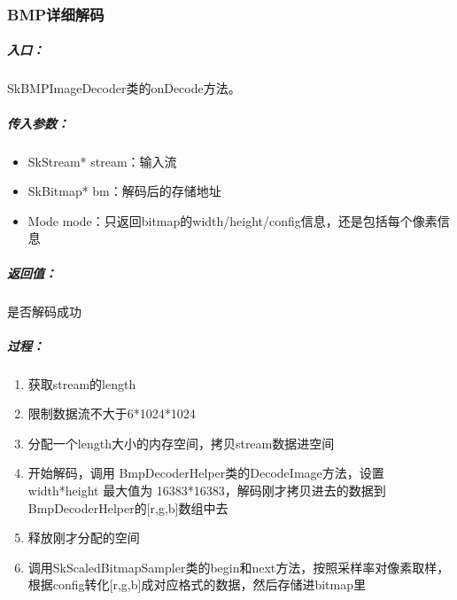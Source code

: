 \subsubsection{BMP详细解码}
\label{sec:bmp-decode}

\subparagraph{入口：}
SkBMPImageDecoder类的onDecode方法。

\subparagraph{传入参数：}
  \begin{itemize}
  \item SkStream* stream：输入流
  \item SkBitmap* bm：解码后的存储地址
  \item Mode mode：只返回bitmap的width/height/config信息，还是包括每个像素信息
  \end{itemize}

\subparagraph{返回值：}
是否解码成功

\subparagraph{过程：}
\begin{enumerate}
\item 获取stream的length
\item 限制数据流不大于6*1024*1024
\item 分配一个length大小的内存空间，拷贝stream数据进空间
\item 开始解码，调用 BmpDecoderHelper类的DecodeImage方法，设置width*height 最大值为 16383*16383，解码刚才拷贝进去的数据到BmpDecoderHelper的[r,g,b]数组中去
\item 释放刚才分配的空间
\item 调用SkScaledBitmapSampler类的begin和next方法，按照采样率对像素取样，根据config转化[r,g,b]成对应格式的数据，然后存储进bitmap里
\end{enumerate}

